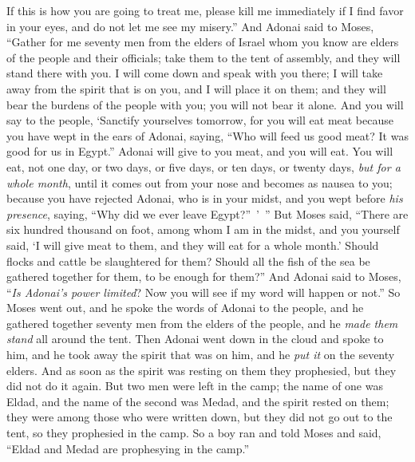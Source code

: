 \begin{biblechapter}
\verse If this is how you are going to treat me, please kill me immediately if I find favor in your eyes, and do not let me see my misery.”
\verse And Adonai said to Moses, “Gather for me seventy men from the elders of Israel whom you know are elders of the people and their officials; take them to the tent of assembly, and they will stand there with you.
\verse I will come down and speak with you there; I will take away from the spirit that is on you, and I will place it on them; and they will bear the burdens of the people with you; you will not bear it alone.
\verse And you will say to the people, ‘Sanctify yourselves tomorrow, for you will eat meat because you have wept in the ears of Adonai, saying, “Who will feed us good meat? It was good for us in Egypt.” Adonai will give to you meat, and you will eat.
\verse You will eat, not one day, or two days, or five days, or ten days, or twenty days,
\verse \textit{but for a whole month}, until it comes out from your nose and becomes as nausea to you; because you have rejected Adonai, who is in your midst, and you wept before \textit{his presence}, saying, “Why did we ever leave Egypt?” ’ ”
\verse But Moses said, “There are six hundred thousand on foot, among whom I am in the midst, and you yourself said, ‘I will give meat to them, and they will eat for a whole month.’
\verse Should flocks and cattle be slaughtered for them? Should all the fish of the sea be gathered together for them, to be enough for them?”
\verse And Adonai said to Moses, “\textit{Is Adonai’s power limited}? Now you will see if my word will happen or not.”
\verse So Moses went out, and he spoke the words of Adonai to the people, and he gathered together seventy men from the elders of the people, and he \textit{made them stand} all around the tent.
\verse Then Adonai went down in the cloud and spoke to him, and he took away the spirit that was on him, and he \textit{put it} on the seventy elders. And as soon as the spirit was resting on them they prophesied, but they did not do it again.
\verse But two men were left in the camp; the name of one was Eldad, and the name of the second was Medad, and the spirit rested on them; they were among those who were written down, but they did not go out to the tent, so they prophesied in the camp.
\verse So a boy ran and told Moses and said, “Eldad and Medad are prophesying in the camp.”

\end{biblechapter}
